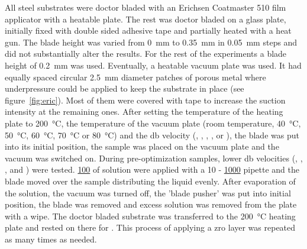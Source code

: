 All steel substrates 
were doctor bladed with 
an Erichsen Coatmaster 510 film applicator with a heatable plate.
The rest was doctor bladed on a glass plate, initially fixed with double sided adhesive tape and 
partially heated with a heat gun.
The blade height was varied from \SI{0}{\milli\meter} to \SI{0.35}{\milli\meter} in 
\SI{0.05}{\milli\meter} steps and did not substantially alter the results.
For the rest of the experiments a blade height of \SI{0.2}{\milli\meter} was used.
%
Eventually, a heatable vacuum plate was used. It 
had equally spaced circular \SI{2.5}{\milli\meter} diameter patches of porous metal where 
underpressure could be applied to keep the substrate in place (see 
figure~\ref{fig:eric}). 
Most of them were covered with tape to increase the suction intensity at the remaining ones. 
After setting the temperature of the heating plate to 
\SI{200}{\celsius}, the temperature of the vacuum plate (room temperature, \SI{40}{\celsius}, 
\SI{50}{\celsius}, \SI{60}{\celsius}, \SI{70}{\celsius} or \SI{80}{\celsius}) and the 
\gls{db} velocity (, , , ,  or ), 
the blade was put into its initial position, the sample was placed on the vacuum plate and the vacuum 
was switched on. 
During pre-optimization samples, lower \gls{db} velocities (, , 
,  and ) were tested. 
\ul{100} of solution were 
applied with a 10 - \ul{1000} pipette and the blade moved over the sample distributing the 
liquid evenly. After evaporation of the solution, the vacuum was turned off, the 'blade 
pusher' was put into initial position, the blade was removed and excess solution 
was removed from the plate with a wipe. 
The doctor bladed substrate was transferred to the \SI{200}{\celsius} heating plate and 
rested on there for . 
This process of applying a \gls{zro} layer was repeated as many times as needed.
